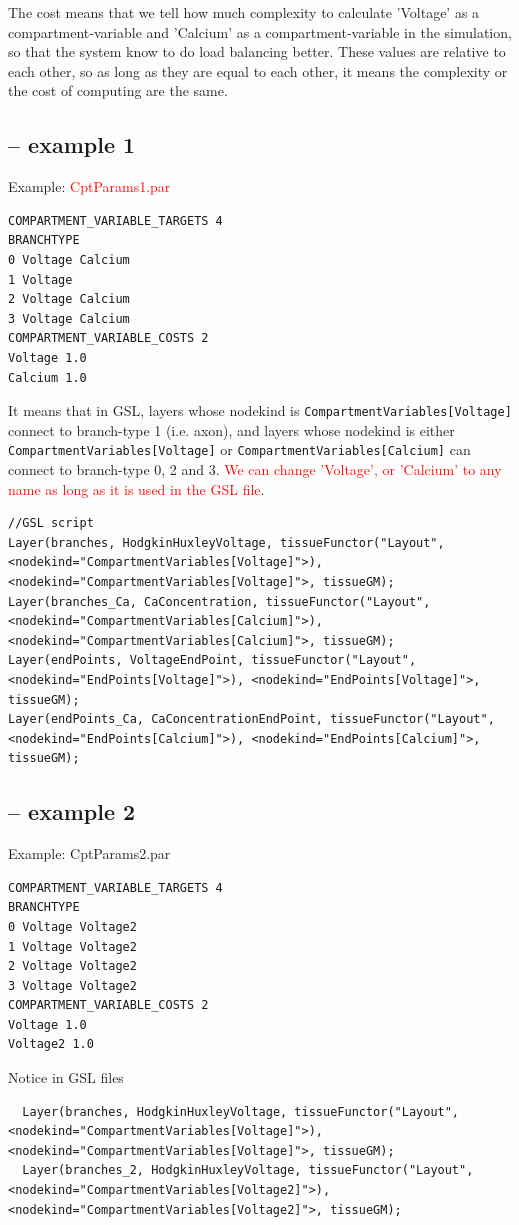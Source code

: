 The cost means that we tell how much complexity to calculate 'Voltage' as a
compartment-variable and 'Calcium' as a compartment-variable in the simulation,
so that the system know to do load balancing better. These values are relative
to each other, so as long as they are equal to each other, it means the
complexity or the cost of computing are the same.

\subsection{-- example 1}

Example: \textcolor{red}{CptParams1.par}
\begin{verbatim}
COMPARTMENT_VARIABLE_TARGETS 4
BRANCHTYPE
0 Voltage Calcium
1 Voltage
2 Voltage Calcium
3 Voltage Calcium
COMPARTMENT_VARIABLE_COSTS 2
Voltage 1.0
Calcium 1.0
\end{verbatim}
It means that in GSL, layers whose nodekind is 
\verb!CompartmentVariables[Voltage]! connect to branch-type 1 (i.e. axon), 
and layers whose nodekind is either \verb!CompartmentVariables[Voltage]!
or \verb!CompartmentVariables[Calcium]! can connect to branch-type 0, 2 and 3.
\textcolor{red}{We can change 'Voltage', or 'Calcium' to any name as long as it
is used in the GSL file}.

{\tiny
\begin{verbatim}
//GSL script
Layer(branches, HodgkinHuxleyVoltage, tissueFunctor("Layout", <nodekind="CompartmentVariables[Voltage]">), <nodekind="CompartmentVariables[Voltage]">, tissueGM);
Layer(branches_Ca, CaConcentration, tissueFunctor("Layout", <nodekind="CompartmentVariables[Calcium]">), <nodekind="CompartmentVariables[Calcium]">, tissueGM);
Layer(endPoints, VoltageEndPoint, tissueFunctor("Layout", <nodekind="EndPoints[Voltage]">), <nodekind="EndPoints[Voltage]">, tissueGM);
Layer(endPoints_Ca, CaConcentrationEndPoint, tissueFunctor("Layout", <nodekind="EndPoints[Calcium]">), <nodekind="EndPoints[Calcium]">, tissueGM);
\end{verbatim}
}

\subsection{-- example 2}

Example: CptParams2.par
\begin{verbatim}
COMPARTMENT_VARIABLE_TARGETS 4
BRANCHTYPE
0 Voltage Voltage2
1 Voltage Voltage2
2 Voltage Voltage2
3 Voltage Voltage2
COMPARTMENT_VARIABLE_COSTS 2
Voltage 1.0
Voltage2 1.0
\end{verbatim}
Notice in GSL files
{\tiny
\begin{verbatim}
  Layer(branches, HodgkinHuxleyVoltage, tissueFunctor("Layout", <nodekind="CompartmentVariables[Voltage]">), <nodekind="CompartmentVariables[Voltage]">, tissueGM);
  Layer(branches_2, HodgkinHuxleyVoltage, tissueFunctor("Layout", <nodekind="CompartmentVariables[Voltage2]">), <nodekind="CompartmentVariables[Voltage2]">, tissueGM);
\end{verbatim}
}

